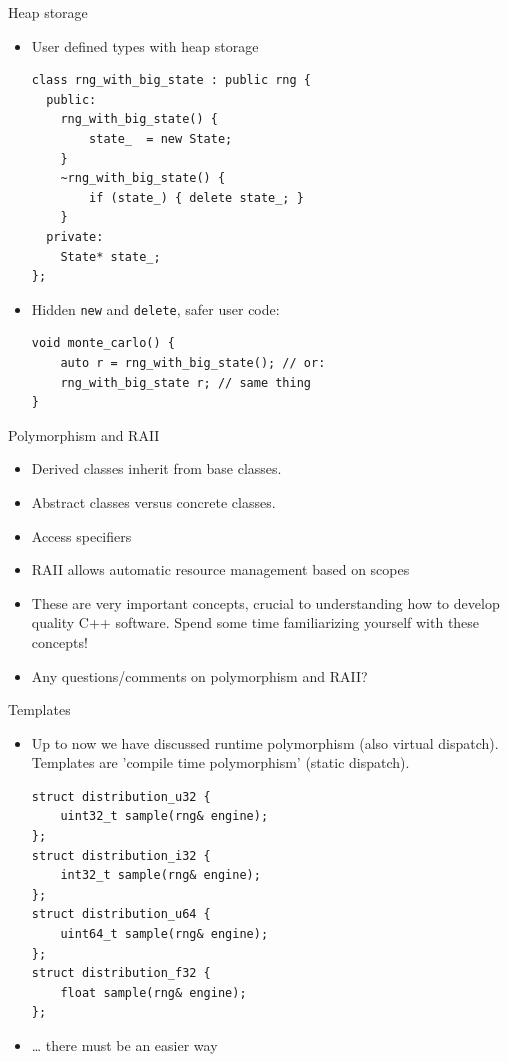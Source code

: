\documentclass[10pt]{beamer}
\begin{document}
\begin{frame}[fragile,label={sec:org258f839}]{Heap storage}
 \begin{itemize}
\item User defined types with heap storage
\begin{verbatim}
class rng_with_big_state : public rng {
  public:
    rng_with_big_state() {
        state_  = new State;
    }
    ~rng_with_big_state() {
        if (state_) { delete state_; }
    }
  private:
    State* state_;
};
\end{verbatim}
\item Hidden \texttt{new} and \texttt{delete}, safer user code:
\begin{verbatim}
void monte_carlo() {
    auto r = rng_with_big_state(); // or:
    rng_with_big_state r; // same thing
}
\end{verbatim}
\end{itemize}
\end{frame}
\begin{frame}[label={sec:orgd67584e}]{Polymorphism and RAII}
\begin{itemize}
\item \alert{Derived classes} inherit from \alert{base classes}.
\item \alert{Abstract classes} versus \alert{concrete classes}.
\item Access specifiers
\item RAII allows automatic resource management based on scopes
\item These are very important concepts, crucial to understanding how to develop
quality C++ software. Spend some time familiarizing yourself with these
concepts!
\item \alert{\alert{Any questions/comments on polymorphism and RAII?}}
\end{itemize}
\end{frame}
\begin{frame}[fragile,label={sec:org3b4012f}]{Templates}
 \begin{itemize}
\item Up to now we have discussed runtime polymorphism (also \alert{virtual dispatch}). Templates are 'compile time polymorphism' (\alert{static dispatch}).
\begin{verbatim}
struct distribution_u32 {
    uint32_t sample(rng& engine);
};
struct distribution_i32 {
    int32_t sample(rng& engine);
};
struct distribution_u64 {
    uint64_t sample(rng& engine);
};
struct distribution_f32 {
    float sample(rng& engine);
};
\end{verbatim}
\item \ldots{} there must be an easier way
\end{itemize}
\end{frame}
\end{document}
